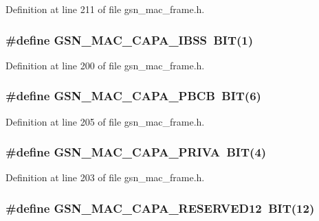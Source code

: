 Definition at line 211 of file gsn\_\-mac\_\-frame.h.

\hypertarget{a00523_aa85a5c8ba2e35c2cf81272cda811b187}{
\subsubsection[{GSN\_\-MAC\_\-CAPA\_\-IBSS}]{\setlength{\rightskip}{0pt plus 5cm}\#define GSN\_\-MAC\_\-CAPA\_\-IBSS~BIT(1)}}
\label{a00523_aa85a5c8ba2e35c2cf81272cda811b187}


Definition at line 200 of file gsn\_\-mac\_\-frame.h.

\hypertarget{a00523_a0b79bd937db4ae3b76643316109fd73b}{
\subsubsection[{GSN\_\-MAC\_\-CAPA\_\-PBCB}]{\setlength{\rightskip}{0pt plus 5cm}\#define GSN\_\-MAC\_\-CAPA\_\-PBCB~BIT(6)}}
\label{a00523_a0b79bd937db4ae3b76643316109fd73b}


Definition at line 205 of file gsn\_\-mac\_\-frame.h.

\hypertarget{a00523_aa6e5e7ce295d1680d0732f20a547ab88}{
\subsubsection[{GSN\_\-MAC\_\-CAPA\_\-PRIVA}]{\setlength{\rightskip}{0pt plus 5cm}\#define GSN\_\-MAC\_\-CAPA\_\-PRIVA~BIT(4)}}
\label{a00523_aa6e5e7ce295d1680d0732f20a547ab88}


Definition at line 203 of file gsn\_\-mac\_\-frame.h.

\hypertarget{a00523_a0fdb3e122d9b19332daa05bfeddef6e4}{
\subsubsection[{GSN\_\-MAC\_\-CAPA\_\-RESERVED12}]{\setlength{\rightskip}{0pt plus 5cm}\#define GSN\_\-MAC\_\-CAPA\_\-RESERVED12~BIT(12)}}
\label{a00523_a0fdb3e122d9b19332daa05bfeddef6e4}


